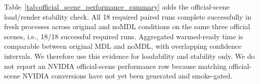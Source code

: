 

Table~\ref{tab:official_scene_performance_summary} adds the official-scene
load/render stability check. All 18 required paired runs complete successfully
in fresh processes across original and noMDL conditions on the same three
official scenes, i.e., 18/18 successful required runs. Aggregated
warmed-ready time is comparable between original MDL and noMDL, with
overlapping confidence intervals. We therefore use this evidence for
loadability and stability only. We do not report an NVIDIA official-scene
performance row because matching official-scene NVIDIA conversions have not yet
been generated and smoke-gated.
